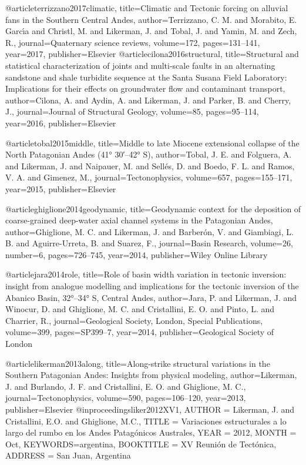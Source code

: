 @article{terrizzano2017climatic,
  title={Climatic and Tectonic forcing on alluvial fans in the Southern Central Andes},
  author={Terrizzano, C. M. and Morabito, E. Garc{\'\i}a and Christl, M. and Likerman, J. and Tobal, J. and Yamin, M. and Zech, R.},
  journal={Quaternary science reviews},
  volume={172},
  pages={131--141},
  year={2017},
  publisher={Elsevier}
}
@article{cilona2016structural,
  title={Structural and statistical characterization of joints and multi-scale faults in an alternating sandstone and shale turbidite sequence at the Santa Susana Field Laboratory: Implications for their effects on groundwater flow and contaminant transport},
  author={Cilona, A. and Aydin, A. and Likerman, J. and Parker, B. and Cherry, J.},
  journal={Journal of Structural Geology},
  volume={85},
  pages={95--114},
  year={2016},
  publisher={Elsevier}
}

@article{tobal2015middle,
  title={Middle to late Miocene extensional collapse of the North Patagonian Andes (41° 30′--42° S)},
  author={Tobal, J. E. and Folguera, A. and Likerman, J. and Naipauer, M. and Sell{\'e}s, D. and Boedo, F. L. and Ramos, V. A. and Gimenez, M.},
  journal={Tectonophysics},
  volume={657},
  pages={155--171},
  year={2015},
  publisher={Elsevier}
}

@article{ghiglione2014geodynamic,
  title={Geodynamic context for the deposition of coarse-grained deep-water axial channel systems in the Patagonian Andes},
  author={Ghiglione, M. C. and Likerman, J. and Barber{\'o}n, V. and Giambiagi, L. B. and Aguirre-Urreta, B. and Suarez, F.},
  journal={Basin Research},
  volume={26},
  number={6},
  pages={726--745},
  year={2014},
  publisher={Wiley Online Library}
}

@article{jara2014role,
  title={Role of basin width variation in tectonic inversion: insight from analogue modelling and implications for the tectonic inversion of the Abanico Basin, 32°--34° S, Central Andes},
  author={Jara, P. and Likerman, J. and Winocur, D. and Ghiglione, M. C. and Cristallini, E. O. and Pinto, L. and Charrier, R.},
  journal={Geological Society, London, Special Publications},
  volume={399},
  pages={SP399--7},
  year={2014},
  publisher={Geological Society of London}
}

@article{likerman2013along,
  title={Along-strike structural variations in the Southern Patagonian Andes: Insights from physical modeling},
  author={Likerman, J. and Burlando, J. F. and Cristallini, E. O. and Ghiglione, M. C.},
  journal={Tectonophysics},
  volume={590},
  pages={106--120},
  year={2013},
  publisher={Elsevier}
}
@inproceedings{liker2012XV1,
  AUTHOR = {Likerman, J. and Cristallini, E.O. and Ghiglione, M.C.},
  TITLE = {{Variaciones estructurales a lo largo del rumbo en los Andes Patag{\'o}nicos Australes}},
  YEAR = {2012},
  MONTH = Oct,
  KEYWORDS={argentina},
  BOOKTITLE = {{XV Reuni{\'o}n de Tect{\'o}nica}},
  ADDRESS = {San Juan, Argentina}
}

